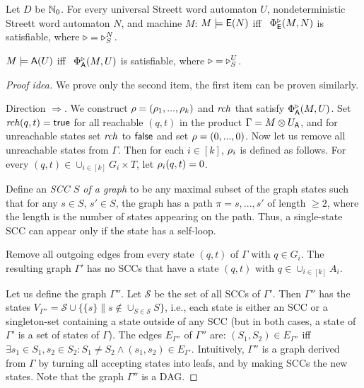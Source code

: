 \begin{theorem}
Let $D$ be $\mathbb{N}_0$.
For every universal Streett word automaton $U$,
nondeterministic Streett word automaton $N$, and
machine $M$:
\li
\- $M \models {\ensuremath{\operatorname{\mathsf{E}}}}(N)$
   iff~
   $\Phi^{\triangleright}_{\operatorname{\mathsf{E}}}(M,N)$ is satisfiable,
   where $\triangleright=\triangleright^N_S$.

\- $M \models {\ensuremath{\operatorname{\mathsf{A}}}}(U)$
   iff~
   $\Phi^{\triangleright}_{\operatorname{\mathsf{A}}}(M,U)$ is satisfiable,
   where $\triangleright=\triangleright^U_S$.
\il
\end{theorem}
\begin{proof}[Proof idea]
We prove only the second item, the first item can be proven similarly.

Direction $\Rightarrow$.
We construct $\rho = (\rho_1,...,\rho_k)$ and $\mathit{rch}$ that satisfy $\Phi^{\triangleright}_{\operatorname{\mathsf{A}}}(M,U)$.
Set $\mathit{rch}(q,t) =\textsf{true}$ for all reachable $(q,t)$ in the product $\Gamma = M \otimes U_{\operatorname{\mathsf{A}}}$,
and for unreachable states set $\mathit{rch}$ to $\textsf{false}$ and set $\rho = (0,...,0)$.
Now let us remove all unreachable states from $\Gamma$.
Then for each $i \in [k]$, $\rho_i$ is defined as follows.
\li
\- For every $(q,t) \in \cup_{i\in[k]} G_i \times T$,
   let $\rho_i(q,t) = 0$.

\- Define an \emph{SCC $S$ of a graph} to be any maximal subset of the graph states
   such that for any $s \in S$, $s' \in S$,
   the graph has a path $\pi = s,...,s'$ of length $\geq 2$,
   where the length is the number of states appearing on the path.
   Thus, a single-state SCC can appear only if the state has a self-loop.

\- Remove all outgoing edges from every state $(q,t)$ of $\Gamma$ with $q \in G_i$.
   The resulting graph $\Gamma'$ has no SCCs that have a state $(q,t)$ with $q \in \cup_{i \in [k]} A_i$.

\- Let us define the graph $\Gamma''$.
   Let $\mathcal{S}$ be the set of all SCCs of $\Gamma'$.
   Then $\Gamma''$ has the states
   $V_{\Gamma''} =
   \mathcal{S}
   \cup
   \{ \{ s \} \| s \not\in \cup_{S \in \mathcal{S}} S \}$,
   i.e., each state is either an SCC or a singleton-set
   containing a state outside of any SCC
   (but in both cases, a state of $\Gamma'$ is a set of states of $\Gamma$).
   The edges $E_{\Gamma''}$ of $\Gamma''$ are:
   $(S_1,S_2) \in E_{\Gamma''}$
   iff
   $\exists s_1 \in S_1, s_2 \in S_2: S_1 \neq S_2 \land (s_1,s_2) \in E_{\Gamma'}$.
   Intuitively, $\Gamma''$ is a graph derived from $\Gamma$
   by turning all accepting states into leafs,
   and by making SCCs the new states.
   Note that the graph $\Gamma''$ is a DAG.


\end{proof}
